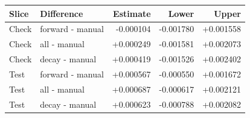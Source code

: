 \begin{center}\small\begin{tabular}{llrrr}\toprule Slice & Difference & Estimate & Lower & Upper\\\midrule
Check & forward - manual & -0.000104 & -0.001780 & +0.001558 \\
Check & all - manual & +0.000249 & -0.001581 & +0.002073 \\
Check & decay - manual & +0.000419 & -0.001526 & +0.002402 \\
Test & forward - manual & +0.000567 & -0.000550 & +0.001672 \\
Test & all - manual & +0.000687 & -0.000617 & +0.002121 \\
Test & decay - manual & +0.000623 & -0.000788 & +0.002082 \\\bottomrule\end{tabular}\end{center}
